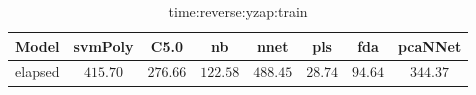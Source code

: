 \begin{table}[!ht]
	\centering
	\begin{tabular}{|c|c|c|c|c|c|c|c|}
		\hline
		Model & svmPoly & C5.0 & nb & nnet & pls & fda & pcaNNet \\ \hline
		elapsed & $415.70$ & $276.66$ & $122.58$ & $488.45$ & $28.74$ & $94.64$ & $344.37$ \\ \hline
	\end{tabular}
	\caption{time:reverse:yzap:train}
	\label{tab:time:reverse:yzap:train}
\end{table}

